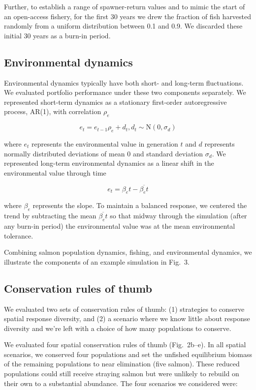 \noindent
Further, to establish a range of spawner-return values and to mimic the start of an open-access fishery, for the first 30 years we drew the fraction of fish harvested randomly from a uniform distribution between 0.1 and 0.9. We discarded these initial 30 years as a burn-in period.

\subsection{Environmental dynamics}

Environmental dynamics typically have both short- and long-term fluctuations. We evaluated portfolio performance under these two components separately. We represented short-term dynamics as a stationary first-order autoregressive process, AR(1), with correlation $\rho_e$

\[e_t = e_{t-1} \rho_e + d_t, d_t \sim \mathrm{N}(0, \sigma_d)\]

\noindent where $e_t$ represents the environmental value in generation $t$ and $d$ represents normally distributed deviations of mean 0 and standard deviation $\sigma_d$. We represented long-term environmental dynamics as a linear shift in the environmental value through time

\[e_t = \beta_e t - \overline{\beta_e t}\]

\noindent where $\beta_e$ represents the slope. To maintain a balanced response, we centered the trend by subtracting the mean $\overline{\beta_e t}$ so that midway through the simulation (after any burn-in period) the environmental value was at the mean environmental tolerance.

Combining salmon population dynamics, fishing, and environmental dynamics, we illustrate the components of an example simulation in Fig.~3.

\subsection{Conservation rules of thumb}

We evaluated two sets of conservation rules of thumb: (1) strategies to conserve spatial response diversity, and (2) a scenario where we know little about response diversity and we're left with a choice of how many populations to conserve.

We evaluated four spatial conservation rules of thumb (Fig.~2b--e). In all spatial scenarios, we conserved four populations and set the unfished equilibrium biomass of the remaining populations to near elimination (five salmon). These reduced populations could still receive straying salmon but were unlikely to rebuild on their own to a substantial abundance. The four scenarios we considered were:

